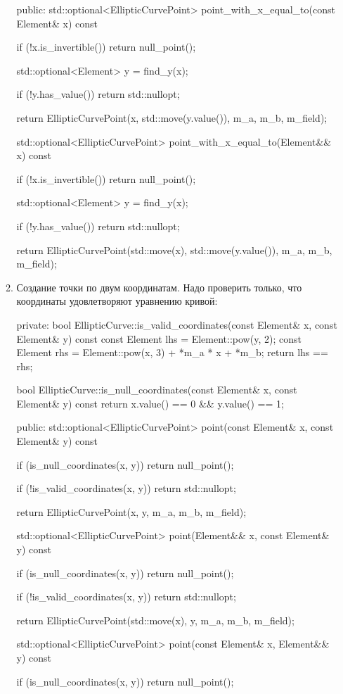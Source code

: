\begin{itemize}
\begin{enumerate}
\begin{cppcode}
public:
std::optional<EllipticCurvePoint> point_with_x_equal_to(const Element& x) const {
    if (!x.is_invertible()) {
        return null_point();
    }

    std::optional<Element> y = find_y(x);

    if (!y.has_value()) {
        return std::nullopt;
    }

    return EllipticCurvePoint(x, std::move(y.value()), m_a, m_b, m_field);
}

std::optional<EllipticCurvePoint> point_with_x_equal_to(Element&& x) const {
    if (!x.is_invertible()) {
        return null_point();
    }

    std::optional<Element> y = find_y(x);

    if (!y.has_value()) {
        return std::nullopt;
    }

    return EllipticCurvePoint(std::move(x), std::move(y.value()), m_a, m_b, m_field);
}
    \end{cppcode}
    \item Создание точки по двум координатам. Надо проверить только, что координаты удовлетворяют уравнению кривой:
    \begin{cppcode}
private:
bool EllipticCurve::is_valid_coordinates(const Element& x, const Element& y) const {
    const Element lhs = Element::pow(y, 2);
    const Element rhs = Element::pow(x, 3) + *m_a * x + *m_b;
    return lhs == rhs;
}

bool EllipticCurve::is_null_coordinates(const Element& x, const Element& y) const {
    return x.value() == 0 && y.value() == 1;
}

public:
std::optional<EllipticCurvePoint> point(const Element& x, const Element& y) const {
    if (is_null_coordinates(x, y)) {
        return null_point();
    }

    if (!is_valid_coordinates(x, y)) {
        return std::nullopt;
    }

    return EllipticCurvePoint(x, y, m_a, m_b, m_field);
}

std::optional<EllipticCurvePoint> point(Element&& x, const Element& y) const {
    if (is_null_coordinates(x, y)) {
        return null_point();
    }

    if (!is_valid_coordinates(x, y)) {
        return std::nullopt;
    }

    return EllipticCurvePoint(std::move(x), y, m_a, m_b, m_field);
}

std::optional<EllipticCurvePoint> point(const Element& x, Element&& y) const {
    if (is_null_coordinates(x, y)) {
        return null_point();
    }

}
\end{cppcode}
\end{enumerate}
\end{itemize}
